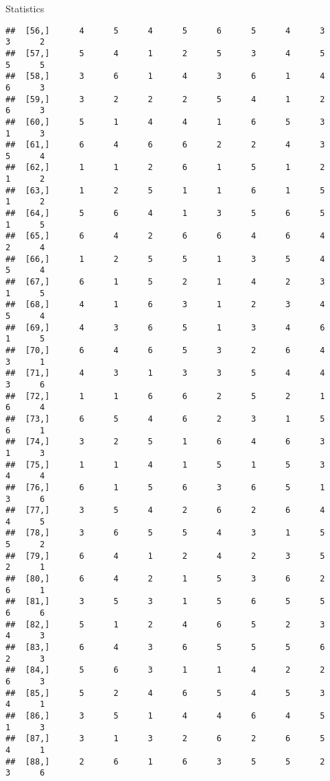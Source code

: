 \documentclass[
  ignorenonframetext,
]{beamer}
\begin{document}
\begin{frame}[fragile]{Statistics}
\begin{verbatim}
##  [56,]      4      5      4      5      6      5      4      3      3      2
##  [57,]      5      4      1      2      5      3      4      5      5      5
##  [58,]      3      6      1      4      3      6      1      4      6      3
##  [59,]      3      2      2      2      5      4      1      2      6      3
##  [60,]      5      1      4      4      1      6      5      3      1      3
##  [61,]      6      4      6      6      2      2      4      3      5      4
##  [62,]      1      1      2      6      1      5      1      2      1      2
##  [63,]      1      2      5      1      1      6      1      5      1      2
##  [64,]      5      6      4      1      3      5      6      5      1      5
##  [65,]      6      4      2      6      6      4      6      4      2      4
##  [66,]      1      2      5      5      1      3      5      4      5      4
##  [67,]      6      1      5      2      1      4      2      3      1      5
##  [68,]      4      1      6      3      1      2      3      4      5      4
##  [69,]      4      3      6      5      1      3      4      6      1      5
##  [70,]      6      4      6      5      3      2      6      4      3      1
##  [71,]      4      3      1      3      3      5      4      4      3      6
##  [72,]      1      1      6      6      2      5      2      1      6      4
##  [73,]      6      5      4      6      2      3      1      5      6      1
##  [74,]      3      2      5      1      6      4      6      3      1      3
##  [75,]      1      1      4      1      5      1      5      3      4      4
##  [76,]      6      1      5      6      3      6      5      1      3      6
##  [77,]      3      5      4      2      6      2      6      4      4      5
##  [78,]      3      6      5      5      4      3      1      5      5      2
##  [79,]      6      4      1      2      4      2      3      5      2      1
##  [80,]      6      4      2      1      5      3      6      2      6      1
##  [81,]      3      5      3      1      5      6      5      5      6      6
##  [82,]      5      1      2      4      6      5      2      3      4      3
##  [83,]      6      4      3      6      5      5      5      6      2      3
##  [84,]      5      6      3      1      1      4      2      2      6      3
##  [85,]      5      2      4      6      5      4      5      3      4      1
##  [86,]      3      5      1      4      4      6      4      5      1      3
##  [87,]      3      1      3      2      6      2      6      5      4      1
##  [88,]      2      6      1      6      3      5      5      2      3      6

\end{verbatim}
\end{frame}
\end{document}
